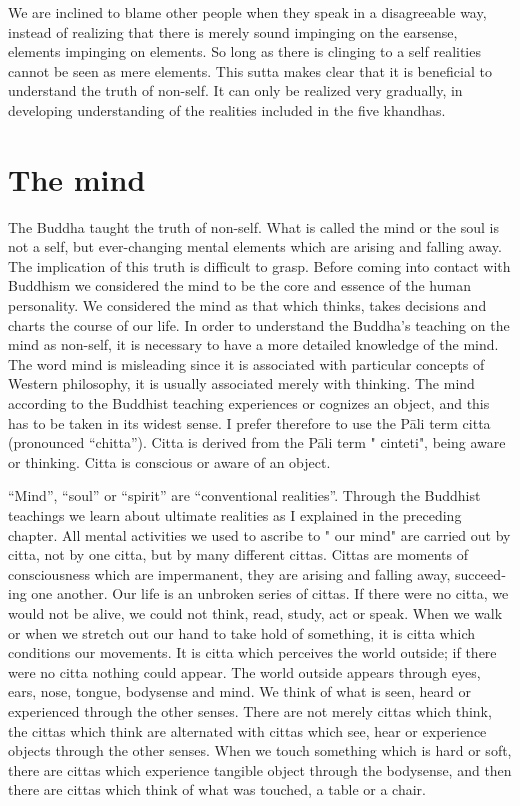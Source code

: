 \documentclass{book}
\begin{document}
We are inclined to blame other people when they speak in a disagreeable
way, instead of realizing that there is merely sound impinging on the
earsense, elements impinging on elements. So long as there is clinging
to a self realities cannot be seen as mere elements. This sutta makes
clear that it is beneficial to understand the truth of non-self. It can
only be realized very gradually, in developing understanding of the
realities included in the five khandhas.

\chapter{The mind}

The Buddha taught the truth of non-self. What is called the mind or the
soul is not a self, but ever-changing mental elements which are arising
and falling away. The implication of this truth is difficult to grasp.
Before coming into contact with Buddhism we considered the mind to be
the core and essence of the human personality. We considered the mind as
that which thinks, takes decisions and charts the course of our life. In
order to understand the Buddha's teaching on the mind as non-self, it is
necessary to have a more detailed knowledge of the mind. The word mind
is misleading since it is associated with particular concepts of Western
philosophy, it is usually associated merely with thinking. The mind
according to the Buddhist teaching experiences or cognizes an object,
and this has to be taken in its widest sense. I prefer therefore to use
the Pāli term citta (pronounced ``chitta''). Citta is derived from the
Pāli term " cinteti", being aware or thinking. Citta is conscious or
aware of an object.

``Mind'', ``soul'' or ``spirit'' are ``conventional realities''. Through
the Buddhist teachings we learn about ultimate realities as I explained
in the preceding chapter. All mental activities we used to ascribe to "
our mind" are carried out by citta, not by one citta, but by many
different cittas. Cittas are moments of consciousness which are
imper­manent, they are arising and falling away, succeed­ing one
another. Our life is an unbroken series of cittas. If there were no
citta, we would not be alive, we could not think, read, study, act or
speak. When we walk or when we stretch out our hand to take hold of
something, it is citta which conditions our movements. It is citta which
per­ceives the world outside; if there were no citta nothing could
appear. The world outside appears through eyes, ears, nose, tongue,
bodysense and mind. We think of what is seen, heard or experienced
through the other senses. There are not merely cittas which think, the
cittas which think are alternated with cittas which see, hear or
experience objects through the other senses. When we touch something
which is hard or soft, there are cittas which experience tangible object
through the bodysense, and then there are cittas which think of what was
touched, a table or a chair.
\end{document}
